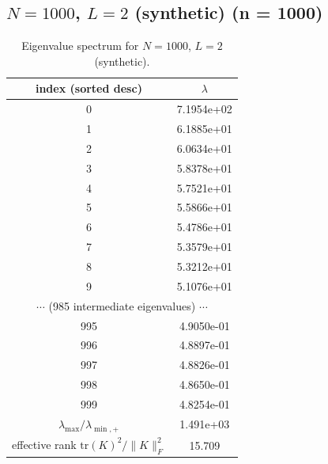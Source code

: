 \subsection*{$N=1000$, $L=2$ (synthetic) \quad (n = 1000)}
\begin{table}[H]
\centering
\caption{Eigenvalue spectrum for $N=1000$, $L=2$ (synthetic).}
\begin{tabular}{c c}
\toprule
index (sorted desc) & $\lambda$ \\
\midrule
0 & 7.1954e+02 \\
1 & 6.1885e+01 \\
2 & 6.0634e+01 \\
3 & 5.8378e+01 \\
4 & 5.7521e+01 \\
5 & 5.5866e+01 \\
6 & 5.4786e+01 \\
7 & 5.3579e+01 \\
8 & 5.3212e+01 \\
9 & 5.1076e+01 \\
\multicolumn{2}{c}{$\cdots$ (985 intermediate eigenvalues) $\cdots$} \\
995 & 4.9050e-01 \\
996 & 4.8897e-01 \\
997 & 4.8826e-01 \\
998 & 4.8650e-01 \\
999 & 4.8254e-01 \\
\midrule
$\lambda_{\max}/\lambda_{\min, +}$ & 1.491e+03 \\
effective rank $\mathrm{tr}(K)^2/\|K\|_F^2$ & 15.709 \\
\bottomrule
\end{tabular}
\end{table}


